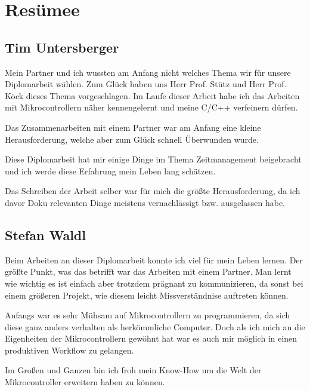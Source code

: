 \chapter{Resümee}

\section{Tim Untersberger}

Mein Partner und ich wussten am Anfang nicht welches Thema wir für unsere Diplomarbeit wählen. Zum Glück haben uns Herr Prof. Stütz und Herr Prof. Köck dieses Thema vorgeschlagen. Im Laufe dieser Arbeit habe ich das Arbeiten mit Mikrocontrollern näher kennengelernt und meine C/C++ verfeinern dürfen. 

Das Zusammenarbeiten mit einem Partner war am Anfang eine kleine Herausforderung, welche aber zum Glück schnell Überwunden wurde.

Diese Diplomarbeit hat mir einige Dinge im Thema Zeitmanagement beigebracht und ich werde diese Erfahrung mein Leben lang schätzen.

Das Schreiben der Arbeit selber war für mich die größte Herausforderung, da ich davor Doku relevanten Dinge meistens vernachlässigt bzw. ausgelassen habe.

\section{Stefan Waldl}
Beim Arbeiten an dieser Diplomarbeit konnte ich viel für mein Leben lernen. Der größte Punkt, was das betrifft war das Arbeiten mit einem Partner. Man lernt wie wichtig es ist einfach aber trotzdem prägnant zu kommunizieren, da sonst bei einem größeren Projekt, wie diesem leicht Missverständnise auftreten können.

Anfangs war es sehr Mühsam auf Mikrocontrollern zu programmieren, da sich diese ganz anders verhalten als herkömmliche Computer. Doch als ich mich an die Eigenheiten der Mikrocontrollern gewöhnt hat war es auch mir möglich in einen produktiven Workflow zu gelangen.

Im Großen und Ganzen bin ich froh mein Know-How um die Welt der Mikrocontroller erweitern haben zu können.